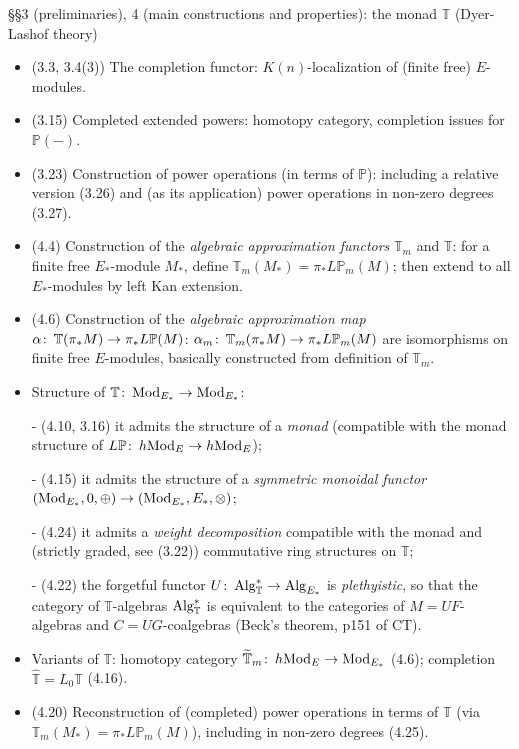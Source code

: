 \documentclass{rs}
\theoremstyle{definition}
\theoremstyle{remark}
\def\co{\colon\thinspace}
\newcommand{\mb}[1]{\mathbb{#1}}
\renewcommand{\=}{\approx}
\renewcommand{\-}{\sim}
\numberwithin{equation}{section}
\numberwithin{thm}{section}
\begin{document}
\S\S 3 (preliminaries), 4 (main constructions and properties): the monad $\mb T$ (Dyer-Lashof theory)
\begin{itemize}
 \item (3.3, 3.4(3)) The completion functor: $K(n)$-localization of (finite free) $E$-modules.

 \item (3.15) Completed extended powers: homotopy category, completion issues for ${\mb P}(-)$.

 \item (3.23) Construction of power operations (in terms of $\mb P$): 
 including a relative version (3.26) and (as its application) power operations in non-zero degrees (3.27).

 \item (4.4) Construction of the {\em algebraic approximation functors} ${\mb T}_m$ and $\mb T$: 
 for a finite free $E_*$-module $M_*$, define ${\mb T}_m (M_*) = \pi_* L {\mb P}_m (M)$; 
 then extend to all $E_*$-modules by left Kan extension.

 \item (4.6) Construction of the {\em algebraic approximation map} $\alpha \co {\mb T} (\pi_* M) \to \pi_* L {\mb P} (M)$: 
 $\alpha_m \co {\mb T}_m (\pi_* M) \to \pi_* L {\mb P}_m (M)$ are isomorphisms on finite free $E$-modules, basically constructed from definition of ${\mb T}_m$.

 \item Structure of ${\mb T} \co {\rm Mod}_{E_*} \to {\rm Mod}_{E_*}$:

 - (4.10, 3.16) it admits the structure of a {\em monad} (compatible with the monad structure of $L{\mb P} \co h{\rm Mod}_E \to h{\rm Mod}_E$);
 
 - (4.15) it admits the structure of a {\em symmetric monoidal functor} $({\rm Mod}_{E_*}, 0, \oplus) \to ({\rm Mod}_{E_*}, E_*, \otimes)$;

 - (4.24) it admits a {\em weight decomposition} compatible with the monad and (strictly graded, see (3.22)) commutative ring structures on $\mb T$;

 - (4.22) the forgetful functor $U \co {\rm Alg}_{\mb T}^* \to {\rm Alg}_{E_*}$ is {\em plethyistic}, 
 so that the category of $\mb T$-algebras ${\rm Alg}_{\mb T}^*$ is equivalent to the categories of $M = UF$-algebras and $C = UG$-coalgebras (Beck's theorem, p151 of CT).

 \item Variants of $\mb T$: homotopy category $\widetilde{\mb T}_m \co h{\rm Mod}_E \to {\rm Mod}_{E_*}$ (4.6); 
 completion $\widehat{\mb T} = L_0 {\mb T}$ (4.16).

 \item (4.20) Reconstruction of (completed) power operations in terms of $\mb T$ (via ${\mb T}_m (M_*) = \pi_* L {\mb P}_m (M)$), including in non-zero degrees (4.25).
\end{itemize}
\end{document}
